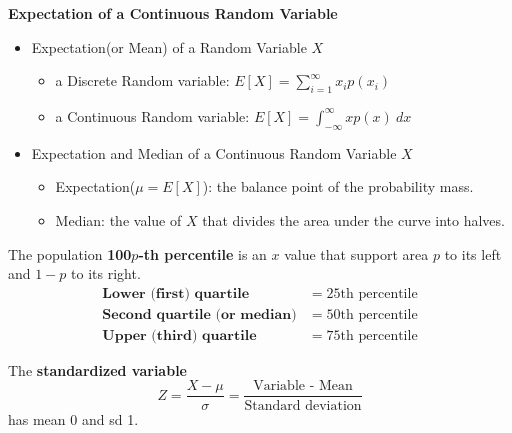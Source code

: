 \documentclass[12pt,openany]{book}
\theoremstyle{definition}
\begin{document}
	\begin{tcolorbox}[colback=white]
		\begin{center}
			\textbf{Expectation of a Continuous Random Variable}
		\end{center}\begin{itemize}
			\item Expectation(or Mean) of a Random Variable $X$\begin{itemize}
				\item a Discrete Random variable: $E[X]=\sum_{i=1}^\infty x_ip(x_i)$
				\item a Continuous Random variable: $E[X]=\int_{-\infty}^\infty xp(x)\ dx$
			\end{itemize}
			\item Expectation and Median of a Continuous Random Variable $X$\begin{itemize}
				\item Expectation($\mu=E[X]$): the balance point of the probability mass.
				\item Median: the value of $X$ that divides the area under the curve into halves.
			\end{itemize}
		\end{itemize}
	\end{tcolorbox}
	\begin{tcolorbox}[colback=white]
		The population \textbf{100$p$-th percentile} is an $x$ value that support area $p$ to its left and $1-p$ to its right. \begin{align*}
		\textbf{Lower (first) quartile} &= 25\text{th percentile} \\
		\textbf{Second quartile (or median)} &= 50\text{th percentile} \\
		\textbf{Upper (third) quartile} &= 75\text{th percentile}
		\end{align*}
	\end{tcolorbox}
	
	\begin{tcolorbox}[colback=white]
		The \textbf{standardized variable} \[
		Z = \frac{X-\mu}{\sigma}=\frac{\text{Variable - Mean}}{\text{Standard deviation}}
		\] has mean $0$ and sd 1.
	\end{tcolorbox}
	
\end{document}
